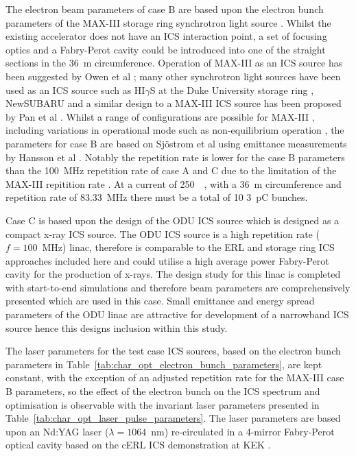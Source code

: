 \documentclass[../main.tex]{subfiles}
\begin{document}
The electron beam parameters of case B are based upon the electron bunch parameters of the MAX-III storage ring synchrotron light source \cite{sjostrom2009max,hansson2011imaging,rosborg2012electron}. Whilst the existing accelerator does not have an ICS interaction point, a set of focusing optics and a Fabry-Perot cavity could be introduced into one of the straight sections in the 36~\si{\metre} circumference. Operation of MAX-III as an ICS source has been suggested by Owen et al \cite{owen2013nonequilibrium}; many other synchrotron light sources have been used as an ICS source such as HI$\gamma$S at the Duke University storage ring \cite{weller2009research}, NewSUBARU \cite{utsunomiya2015gamma} and a similar design to a MAX-III ICS source has been proposed by Pan et al \cite{pan2019design}. Whilst a range of configurations are possible for MAX-III \cite{sjostrom2009max}, including variations in operational mode such as non-equilibrium operation \cite{owen2012modular}, the parameters for case B are based on Sj\"{o}strom et al \cite{sjostrom2009max} using emittance measurements by Hansson et al \cite{hansson2011imaging}. Notably the repetition rate is lower for the case B parameters than the 100~\si{\mega\hertz} repetition rate of case A and C due to the limitation of the MAX-III repitition rate \cite{sjostrom2009max,rosborg2012electron}. At a current of 250~\si{\milli\amperes}, with a 36~\si{\meter} circumference and repetition rate of 83.33~\si{\mega\hertz} \cite{sjostrom2009max,rosborg2012electron} there must be a total of 10 3~\si{\pico\coulomb} bunches.

Case C is based upon the design of the ODU ICS source \cite{krafft2016laser,deitrick2017inverse,deitrick2018high} which is designed as a compact x-ray ICS source. The ODU ICS source is a high repetition rate ($f = 100$~\si{\mega\hertz}) linac, therefore is comparable to the ERL and storage ring ICS approaches included here and could utilise a high average power Fabry-Perot cavity for the production of x-rays. The design study for this linac is completed with start-to-end simulations and therefore beam parameters are comprehensively presented \cite{deitrick2017inverse,deitrick2018high} which are used in this case. Small emittance and energy spread parameters of the ODU linac are attractive for development of a narrowband ICS source hence this designs inclusion within this study.  

The laser parameters for the test case ICS sources, based on the electron bunch parameters in Table~\ref{tab:char_opt_electron_bunch_parameters}, are kept constant, with the exception of an adjusted repetition rate for the MAX-III case B parameters, so the effect of the electron bunch on the ICS spectrum and optimisation is observable with the invariant laser parameters presented in Table~\ref{tab:char_opt_laser_pulse_parameters}. The laser parameters are based upon an Nd:YAG laser ($\lambda = 1064$~\si{\nano\meter}) re-circulated in a 4-mirror Fabry-Perot optical cavity based on the cERL ICS demonstration at KEK \cite{akagi2016narrow}. 
\end{document}
